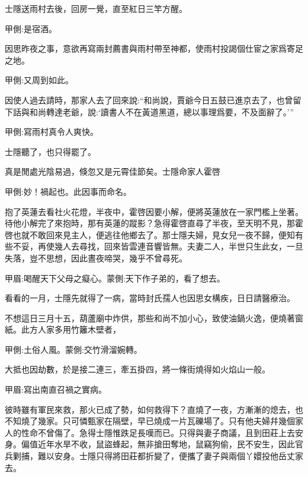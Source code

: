 \begin{parag}
    士隱送雨村去後，回房一覺，直至紅日三竿方醒。\begin{note}甲側:是宿酒。\end{note}因思昨夜之事，意欲再寫兩封薦書與雨村帶至神都，使雨村投謁個仕宦之家爲寄足之地。\begin{note}甲側:又周到如此。\end{note}因使人過去請時，那家人去了回來說:“和尚說，賈爺今日五鼓已進京去了，也曾留下話與和尚轉達老爺，說:‘讀書人不在黃道黑道，總以事理爲要，不及面辭了。’”\begin{note}甲側:寫雨村真令人爽快。\end{note}士隱聽了，也只得罷了。
\end{parag}


\begin{parag}
    真是閒處光陰易過，倏忽又是元霄佳節矣。士隱命家人霍啓\begin{note}甲側:妙！禍起也。此因事而命名。\end{note}抱了英蓮去看社火花燈，半夜中，霍啓因要小解，便將英蓮放在一家門檻上坐著。待他小解完了來抱時，那有英蓮的蹤影？急得霍啓直尋了半夜，至天明不見，那霍啓也就不敢回來見主人，便逃往他鄉去了。那士隱夫婦，見女兒一夜不歸，便知有些不妥，再使幾人去尋找，回來皆雲連音響皆無。夫妻二人，半世只生此女，一旦失落，豈不思想，因此晝夜啼哭，幾乎不曾尋死。\begin{note}甲眉:喝醒天下父母之癡心。蒙側:天下作子弟的，看了想去。\end{note}看看的一月，士隱先就得了一病，當時封氏孺人也因思女構疾，日日請醫療治。
\end{parag}


\begin{parag}
    不想這日三月十五，葫蘆廟中炸供，那些和尚不加小心，致使油鍋火逸，便燒著窗紙。此方人家多用竹籬木壁者，\begin{note}甲側:土俗人風。蒙側:交竹滑溜婉轉。\end{note}大抵也因劫數，於是接二連三，牽五掛四，將一條街燒得如火焰山一般。\begin{note}甲眉:寫出南直召禍之實病。\end{note}彼時雖有軍民來救，那火已成了勢，如何救得下？直燒了一夜，方漸漸的熄去，也不知燒了幾家。只可憐甄家在隔壁，早已燒成一片瓦礫場了。只有他夫婦幷幾個家人的性命不曾傷了。急得士隱惟跌足長嘆而已。只得與妻子商議，且到田莊上去安身。偏值近年水旱不收，鼠盜蜂起，無非搶田奪地，鼠竊狗偷，民不安生，因此官兵剿捕，難以安身。士隱只得將田莊都折變了，便攜了妻子與兩個丫嬛投他岳丈家去。
\end{parag}


